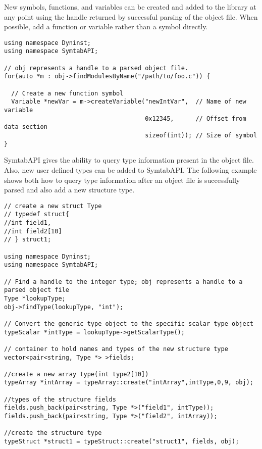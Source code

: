 \newpage

New symbols, functions, and variables can be created and added to the library at any point using the handle returned by successful parsing of the object file. When possible, add a function or variable rather than a symbol directly. 

\begin{lstlisting}
using namespace Dyninst;
using namespace SymtabAPI;

// obj represents a handle to a parsed object file.
for(auto *m : obj->findModulesByName("/path/to/foo.c")) {

  // Create a new function symbol
  Variable *newVar = m->createVariable("newIntVar",  // Name of new variable
                                       0x12345,      // Offset from data section
                                       sizeof(int)); // Size of symbol 
}
\end{lstlisting}

SymtabAPI gives the ability to query type information present in the object file. Also, new user defined types can be added to SymtabAPI. The following example shows both how to query type information after an object file is successfully parsed and also add a new structure type.

\begin{lstlisting}
// create a new struct Type
// typedef struct{
//int field1,
//int field2[10]
// } struct1;

using namespace Dyninst;
using namespace SymtabAPI;

// Find a handle to the integer type; obj represents a handle to a parsed object file
Type *lookupType;
obj->findType(lookupType, "int");

// Convert the generic type object to the specific scalar type object
typeScalar *intType = lookupType->getScalarType();

// container to hold names and types of the new structure type
vector<pair<string, Type *> >fields;

//create a new array type(int type2[10])
typeArray *intArray = typeArray::create("intArray",intType,0,9, obj);

//types of the structure fields
fields.push_back(pair<string, Type *>("field1", intType));
fields.push_back(pair<string, Type *>("field2", intArray));

//create the structure type
typeStruct *struct1 = typeStruct::create("struct1", fields, obj);
\end{lstlisting}

